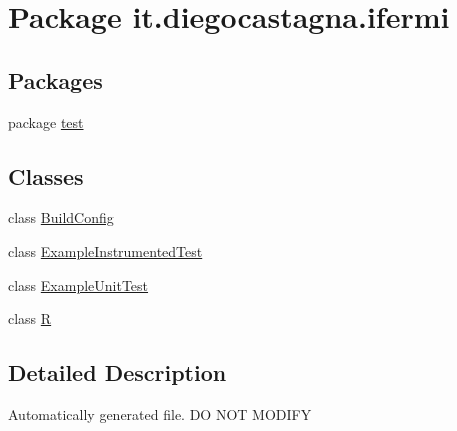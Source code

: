 \hypertarget{namespaceit_1_1diegocastagna_1_1ifermi}{}\section{Package it.\+diegocastagna.\+ifermi}
\label{namespaceit_1_1diegocastagna_1_1ifermi}
\subsection*{Packages}
\begin{DoxyCompactItemize}
\item 
package \mbox{\hyperlink{namespaceit_1_1diegocastagna_1_1ifermi_1_1test}{test}}
\end{DoxyCompactItemize}
\subsection*{Classes}
\begin{DoxyCompactItemize}
\item 
class \mbox{\hyperlink{classit_1_1diegocastagna_1_1ifermi_1_1_build_config}{Build\+Config}}
\item 
class \mbox{\hyperlink{classit_1_1diegocastagna_1_1ifermi_1_1_example_instrumented_test}{Example\+Instrumented\+Test}}
\item 
class \mbox{\hyperlink{classit_1_1diegocastagna_1_1ifermi_1_1_example_unit_test}{Example\+Unit\+Test}}
\item 
class \mbox{\hyperlink{classit_1_1diegocastagna_1_1ifermi_1_1_r}{R}}
\end{DoxyCompactItemize}


\subsection{Detailed Description}
Automatically generated file. DO N\+OT M\+O\+D\+I\+FY 
